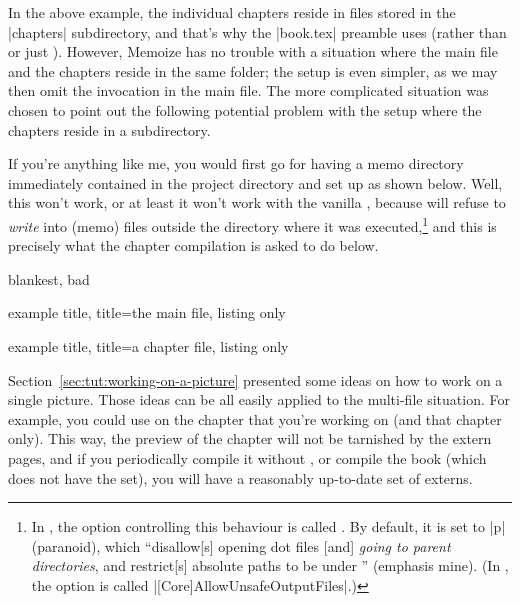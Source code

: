 \documentclass[a4paper,11pt]{article}
\begin{document}
\begin{tcbraster}[raster columns=2, raster valign=top]
\end{tcbraster}

In the above example, the individual chapters reside in files stored in the
|chapters| subdirectory, and that's why the |book.tex| preamble uses
 (rather than  or just ).  However, Memoize has no trouble
with a situation where the main file and the chapters reside in the same
folder; the setup is even simpler, as we may then omit the 
invocation in the main file.  The more complicated situation was chosen to
point out the following potential problem with the setup where the chapters
reside in a subdirectory.

If you're anything like me, you would first go for having a memo directory
immediately contained in the project directory and set up  as
shown below.  Well, this won't work, or at least it won't work with the vanilla
\TeXLive, because  will refuse to \emph{write} into (memo)
files outside the directory where it was
executed,\cprotect\footnote{\label{fn:openout_any}In \TeXLive, the
   option controlling this behaviour is called
  .  By default, it is set to |p| (paranoid), which
  ``disallow[s] opening dot files [and] \emph{going to parent directories}, and
  restrict[s] absolute paths to be under '' (emphasis
  mine).  (In \MiKTeX, the option is called
  |[Core]AllowUnsafeOutputFiles|.)}  and this is precisely what the chapter
compilation is asked to do below.

\begin{tcboxedraster}[raster columns=2, raster valign=top]{blankest, bad}
  \begin{tcblisting}{example title, title=the main file, listing only}

  \end{tcblisting}
  \begin{tcblisting}{example title, title=a chapter file, listing only}
  \end{tcblisting}
\end{tcboxedraster}

\pagebreak %

Section~\ref{sec:tut:working-on-a-picture} presented some ideas on how to work
on a single picture.  Those ideas can be all easily applied to the multi-file
situation.  For example, you could use  on the chapter that you're
working on (and that chapter only).  This way, the preview of the chapter will
not be tarnished by the extern pages, and if you periodically compile it
without , or compile the book (which does not have the 
set), you will have a reasonably up-to-date set of externs.
\end{document}
